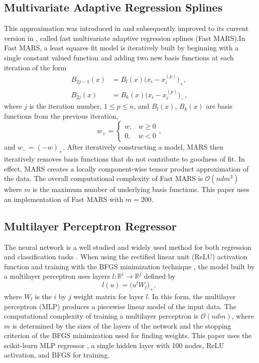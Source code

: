 \documentclass[smallextended]{svjour3}       %
\begin{document}
\subsection{Multivariate Adaptive Regression Splines}
This approximation was introduced in \cite{friedman1991multivariate} and subsequently improved to its current version in \cite{stanford1993fast}, called fast multivariate adaptive regression splines (Fast MARS).In Fast MARS, a least squares fit model is iteratively built by beginning with a single constant valued function and adding two new basis functions at each iteration of the form
\begin{align*}
  B_{2j-1}(x) &= B_l(x) \bigl(x_i-x^{(p)}_i\bigr)_+, \\
  B_{2j}(x) &= B_k(x) \bigl(x_i-x^{(p)}_i\bigr)_- ,
\end{align*}
where $j$ is the iteration number, $1 \le p \le n$, and $B_l(x)$, $B_k(x)$ are basis functions from the previous iteration,
$$w_+ = \begin{cases} w, & w \geq 0 \\ 0, & w < 0 \end{cases},$$
and $w_- = (-w)_+$. After iteratively constructing a model, MARS then iteratively removes basis functions that do not contribute to goodness of fit. In effect, MARS creates a locally component-wise tensor product approximation of the data. The overall computational complexity of Fast MARS is $\mathcal{O}(n d m^3)$ where $m$ is the maximum number of underlying basis functions. This paper uses an implementation of Fast MARS \cite{rudy2017pyearth} with $m = 200$.

\subsection{Multilayer Perceptron Regressor}
The neural network is a well studied and widely used method for both regression and classification tasks \cite{hornik1989multilayer}. When using the rectified linear unit (ReLU) activation function \cite{dahl2013improving} and training with the BFGS minimization technique \cite{moller1993scaled}, the model built by a multilayer perceptron uses layers $l : \mathbb{R}^{i} \rightarrow \mathbb{R}^{j}$ defined by
$$ l(u) = \big( u^t W_l \big)_+ ,$$
where $W_l$ is the $i$ by $j$ weight matrix for layer $l$. In this form, the multilayer perceptron (MLP) produces a piecewise linear model of the input data. The computational complexity of training a multilayer perceptron is $\mathcal{O}(n d m)$, where $m$ is determined by the sizes of the layers of the network and the stopping criterion of the BFGS minimization used for finding weights. This paper uses the scikit-learn MLP regressor \cite{scikit-learn}, a single hidden layer with 100 nodes, ReLU activation, and BFGS for training. 
\end{document}
